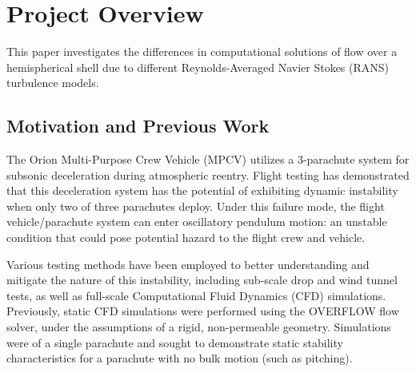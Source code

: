 \documentclass[]{aiaa-tc}%
\begin{document}



\section{Project Overview}

This paper investigates the differences in computational solutions of flow over a hemispherical shell due to different Reynolds-Averaged Navier Stokes (RANS) turbulence models.



\subsection{Motivation and Previous Work}

The Orion Multi-Purpose Crew Vehicle (MPCV) utilizes a 3-parachute system for subsonic deceleration during atmospheric reentry.  Flight testing has demonstrated that this deceleration system has the potential of exhibiting dynamic instability when only two of three parachutes deploy.  Under this failure mode, the flight vehicle/parachute system can enter oscillatory pendulum motion: an unstable condition that could pose potential hazard to the flight crew and vehicle.\cite{ray:15}

Various testing methods have been employed to better understanding and mitigate the nature of this instability, including sub-scale drop and wind tunnel tests, as well as full-scale Computational Fluid Dynamics (CFD) simulations.  Previously, static CFD simulations were performed using the OVERFLOW flow solver, under the assumptions of a rigid, non-permeable geometry.  Simulations were of a single parachute and sought to demonstrate static stability characteristics for a parachute with no bulk motion (such as pitching).\cite{schwing15}
\end{document}
